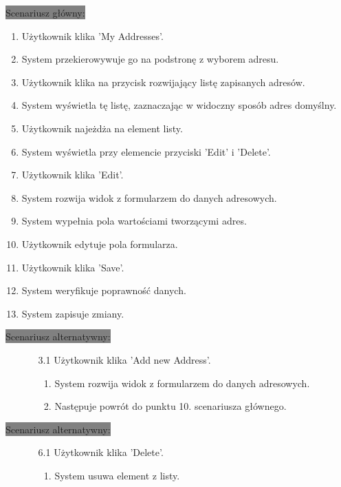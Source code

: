 \documentclass[12pt]{report}
\begin{document}
	\colorbox{grey}{Scenariusz główny:}
	\begin{enumerate}
		\item Użytkownik klika 'My Addresses'.
		\item System przekierowywuje go na podstronę z wyborem adresu.
		\item Użytkownik klika na przycisk rozwijający listę zapisanych adresów.
		\item System wyświetla tę listę, zaznaczając w widoczny sposób adres domyślny.
		\item Użytkownik najeżdża na element listy.
		\item System wyświetla przy elemencie przyciski 'Edit' i 'Delete'.
		\item Użytkownik klika 'Edit'.
		\item System rozwija widok z formularzem do danych adresowych.
		\item System wypełnia pola wartościami tworzącymi adres.
		\item Użytkownik edytuje pola formularza.
		\item Użytkownik klika 'Save'.
		\item System weryfikuje poprawność danych.
		\item System zapisuje zmiany.
	\end{enumerate}
	\colorbox{grey}{Scenariusz alternatywny:}
	\begin{enumerate}\addtocounter{enumi}{2}
		\item[]
		\begin{enumerate}
			\item[3.1] Użytkownik klika 'Add new Address'.
			\begin{enumerate}
				\item System rozwija widok z formularzem do danych adresowych.
				\item Następuje powrót do punktu 10. scenariusza głównego.
			\end{enumerate}
		\end{enumerate}
	\end{enumerate}
	
	\colorbox{grey}{Scenariusz alternatywny:}
	\begin{enumerate}\addtocounter{enumi}{6}
		\item[]
		\begin{enumerate}
			\item[6.1] Użytkownik klika 'Delete'.
			\begin{enumerate}
				\item System usuwa element z listy.	
			\end{enumerate}
		\end{enumerate}
	\end{enumerate}
	
\end{document}
